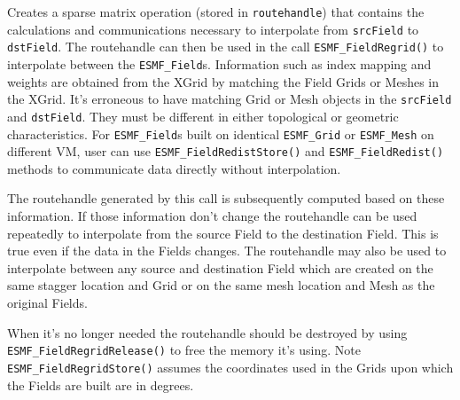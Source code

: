          \begin{sloppypar}
         Creates a sparse matrix operation (stored in {\tt routehandle}) that contains the calculations and 
         communications necessary to interpolate from {\tt srcField} to {\tt dstField}. 
         The routehandle can then be used in the call
         {\tt ESMF\_FieldRegrid()} to interpolate between the {\tt ESMF\_Field}s. Information such as
         index mapping and weights are obtained from the XGrid by matching the Field Grids or Meshes in the XGrid. 
         It's erroneous to have matching Grid or Mesh objects in the {\tt srcField} and {\tt dstField}. 
         They must be different in either topological or geometric characteristics. For {\tt ESMF\_Field}s 
         built on identical {\tt ESMF\_Grid} or {\tt ESMF\_Mesh} on
         different VM, user can use {\tt ESMF\_FieldRedistStore()} and {\tt ESMF\_FieldRedist()} 
         methods to communicate data directly without interpolation.
         \end{sloppypar}
         
         The routehandle generated by this call is subsequently computed based on these information.
         If those information don't change the routehandle can be used repeatedly to interpolate 
         from the source Field to the destination Field. 
         This is true even if the data in the Fields changes. The routehandle may also be used to 
         interpolate between any source and 
         destination Field which are created on the same stagger location and Grid
         or on the same mesh location and Mesh as the original Fields.        
  
         When it's no longer needed the routehandle should be destroyed by using 
         {\tt ESMF\_FieldRegridRelease()} to free the memory it's using. 
         Note {\tt ESMF\_FieldRegridStore()} assumes the coordinates used in the Grids upon which the Fields are built are
     in degrees.  
  
